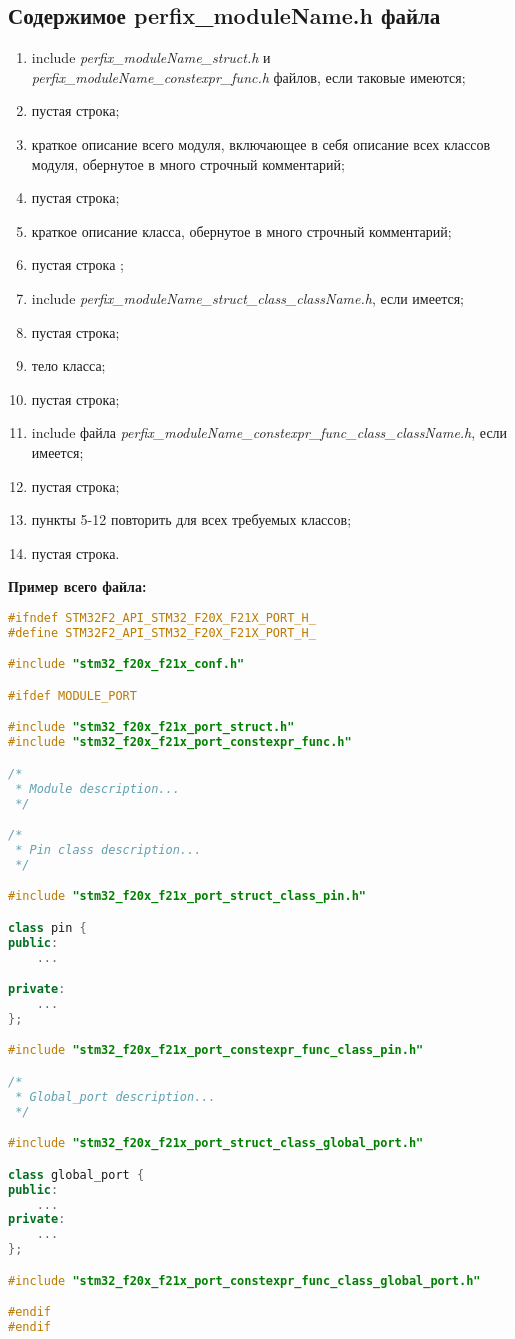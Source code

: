 \subsection{Содержимое perfix\_moduleName.h файла}\label{p:modul:h}
\begin{enumerate}
	\item include \textit{perfix\_moduleName\_struct.h} и \textit{perfix\_moduleName\_constexpr\_func.h}  файлов, если таковые имеются;
	\item пустая строка;
	\item краткое описание всего модуля, включающее в себя описание всех классов модуля, обернутое в много строчный комментарий;
	\item пустая строка;
	\item краткое описание класса, обернутое в много строчный комментарий;
	\item пустая строка ;
	\item include \textit{perfix\_moduleName\_struct\_class\_className.h}, если имеется;
	\item пустая строка;
	\item тело класса;
	\item пустая строка;
	\item include файла \textit{perfix\-\_moduleName\-\_constexpr\-\_func\-\_class\-\_className.h}, если имеется;
	\item пустая строка;
	\item пункты 5-12 повторить для всех требуемых классов;
	\item пустая строка.
\end{enumerate}
\textbf{Пример всего файла:}\begin{lstlisting}[language=C++, frame=tlBR, basicstyle=\fontsize{10}{10}\ttfamily]
#ifndef STM32F2_API_STM32_F20X_F21X_PORT_H_
#define STM32F2_API_STM32_F20X_F21X_PORT_H_

#include "stm32_f20x_f21x_conf.h"

#ifdef MODULE_PORT

#include "stm32_f20x_f21x_port_struct.h"						
#include "stm32_f20x_f21x_port_constexpr_func.h"				

/*
 * Module description...
 */

/*
 * Pin class description...
 */

#include "stm32_f20x_f21x_port_struct_class_pin.h"

class pin {
public:
	...

private:
	...
};

#include "stm32_f20x_f21x_port_constexpr_func_class_pin.h"

/*
 * Global_port description...
 */

#include "stm32_f20x_f21x_port_struct_class_global_port.h"		

class global_port {
public:
	...
private:
	...
};

#include "stm32_f20x_f21x_port_constexpr_func_class_global_port.h"

#endif
#endif\end{lstlisting}

